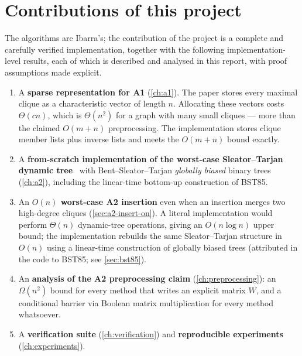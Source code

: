 \documentclass[11pt,a4paper,oneside]{report}
\theoremstyle{plain}
\theoremstyle{definition}
\theoremstyle{remark}
\begin{document}
\section{Contributions of this project}
The algorithms are Ibarra's; the contribution of the project is a complete and carefully
verified implementation, together with the following implementation-level results, each of which is
described and analysed in this report, with proof assumptions made explicit.
\begin{enumerate}
\item A \textbf{sparse representation for A1} (\cref{ch:a1}). The paper stores every maximal
  clique as a characteristic vector of length \(n\). Allocating these vectors costs
  \(\Theta(cn)\), which is \(\Theta(n^2)\) for a graph with many small cliques --- more than
  the claimed \(O(m+n)\) preprocessing. The implementation stores clique member lists plus
  inverse lists and meets the \(O(m+n)\) bound exactly.
\item A \textbf{from-scratch implementation of the worst-case Sleator--Tarjan dynamic
  tree}~\cite{sleator1983} with Bent--Sleator--Tarjan \emph{globally biased} binary
  trees~\cite{bent1985} (\cref{ch:a2}), including the linear-time bottom-up construction of
  BST85.
\item An \textbf{\(O(n)\) worst-case A2 insertion} even when an insertion merges two
  high-degree cliques (\cref{sec:a2-insert-on}). A literal implementation would perform
  \(\Theta(n)\) dynamic-tree operations, giving an \(O(n\log n)\) upper bound; the implementation
  rebuilds the same Sleator--Tarjan structure in \(O(n)\) using a linear-time construction of
  globally biased trees (attributed in the code to BST85; see \cref{sec:bst85}).
\item An \textbf{analysis of the A2 preprocessing claim} (\cref{ch:preprocessing}): an
  \(\Omega(n^2)\) bound for every method that writes an explicit matrix \(W\), and a
  conditional barrier via Boolean matrix multiplication for every method whatsoever.
\item A \textbf{verification suite} (\cref{ch:verification}) and \textbf{reproducible
  experiments} (\cref{ch:experiments}).
\end{enumerate}
\end{document}

